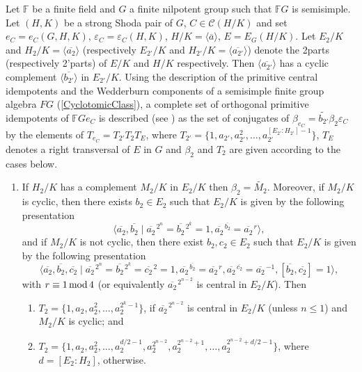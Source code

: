 \documentclass[a4paper,11pt]{report}
\begin{document}
{{ Let $\mathbb F$ be a finite field and $G$ a finite nilpotent group such that $\mathbb F G$ is semisimple. Let $(H,K)$ be a strong Shoda pair of $G$, $C\in\mathcal{C}(H/K)$ and set $e_C=e_C(G,H,K)$, $\varepsilon_C=\varepsilon_C(H,K)$, $H/K=\langle\overline{a}\rangle$, $E=E_G(H/K)$. Let $E_2/K$ and $H_2/K=\langle\overline{a_2}\rangle$ (respectively $E_{2'}/K$ and $H_{2'}/K=\langle\overline{a_{2'}}\rangle$) denote the 2\texttt{}parts (respectively
2'\texttt{}parts) of $E/K$ and $H/K$ respectively. Then $\langle\overline{a_{2'}}\rangle$ has a cyclic complement $\langle\overline{b_{2'}}\rangle$ in $E_{2'}/K$. Using the description of the primitive central idempotents and the
Wedderburn components of a semisimple finite group algebra $F G$ (\ref{CyclotomicClass}), a complete set of orthogonal primitive idempotents of $\mathbb F Ge_C$ is described (see \cite{OV}) as the set of conjugates of $\beta_{e_C}=\widetilde{b_{2'}}\beta_2\varepsilon_C$ by the elements of $T_{e_C}=T_{2'}T_2T_E$, where $T_{2'}=\{1,a_{2'},a_{2'}^2,\dots,a_{2'}^{[E_{2'}:H_{2'}]-1}\}$, $T_E$ denotes a right transversal of $E$ in $G$ and $\beta_2$ and $T_2$ are given according to the cases below. 
\begin{enumerate}
\item  If $H_2/K$ has a complement $M_2/K$ in $E_2/K$ then $\beta_2=\widetilde{M_2}$. Moreover, if $M_2/K$ is cyclic, then there exists $b_2\in E_2$ such that $E_2/K$ is given by the following presentation 
\[\langle \overline{a_2},\overline{b_2}\mid
\overline{a_2}\hspace{1pt}^{2^n}=\overline{b_2}\hspace{1pt}^{2^k}=1,
\overline{a_2}\hspace{1pt}^{\overline{b_2}}=\overline{a_2}\hspace{1pt}^r
\rangle,\]
 and if $M_2/K$ is not cyclic, then there exist $b_2,c_2\in E_2$ such that $E_2/K$ is given by the following presentation 
\[\langle \overline{a_2},\overline{b_2},\overline{c_2}\mid
\overline{a_2}\hspace{1pt}^{2^n}=
\overline{b_2}\hspace{1pt}^{2^k}=\overline{c_2}\hspace{1pt}^2=1,
\overline{a_2}\hspace{1pt}^{\overline{b_2}}=\overline{a_2}\hspace{1pt}^r,
\overline{a_2}\hspace{1pt}^{\overline{c_2}}=\overline{a_2}\hspace{1pt}^{-1},
[\overline{b_2},\overline{c_2}]=1 \rangle,\]
 with $r \equiv 1 {\rm \,mod\,} 4$ (or equivalently $\overline{a_2}\hspace{1pt}^{2^{n-2}}$ is central in $E_2/K$). Then 
\begin{enumerate}
\item  $T_2=\{1,a_2,a_2^2,\dots, a_2^{2^k-1}\}$, if $\overline{a_2}\hspace{1pt}^{2^{n-2}}$ is central in $E_2/K$ (unless $n\leq 1$) and $M_2/K$ is cyclic; and 
\item  $T_2=\{1,a_2,a_2^2,\dots,a_2^{d/2-1},a_2^{2^{n-2}},a_2^{2^{n-2}+1},\dots,a_2^{2^{n-2}+d/2-1}\}$, where $d=[E_2:H_2]$, otherwise. 
\end{enumerate}
 

\end{enumerate}}}
\end{document}
